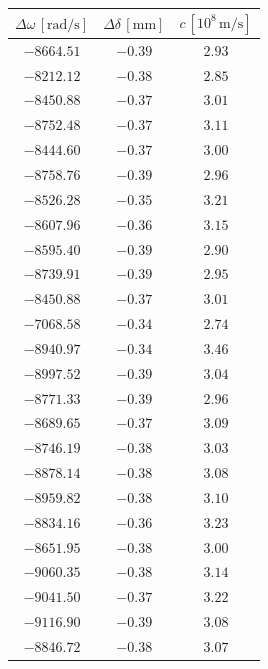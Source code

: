 \documentclass[]{article}
\begin{document}
    \begin{table}
        \centering
        \begin{tabular}{||c|c|c||}
            \hline
            $\Delta \omega \,[\text{rad/s}]$ & $\Delta \delta \,[\text{mm}]$ & $c \,[10^8 \,\text{m/s}]$ \\
            \hline\hline
            $-8664.51$ & $-0.39$ & $2.93$ \\\hline
            $-8212.12$ & $-0.38$ & $2.85$ \\\hline
            $-8450.88$ & $-0.37$ & $3.01$ \\\hline
            $-8752.48$ & $-0.37$ & $3.11$ \\\hline
            $-8444.60$ & $-0.37$ & $3.00$ \\\hline
            $-8758.76$ & $-0.39$ & $2.96$ \\\hline
            $-8526.28$ & $-0.35$ & $3.21$ \\\hline
            $-8607.96$ & $-0.36$ & $3.15$ \\\hline
            $-8595.40$ & $-0.39$ & $2.90$ \\\hline
            $-8739.91$ & $-0.39$ & $2.95$ \\\hline
            $-8450.88$ & $-0.37$ & $3.01$ \\\hline
            $-7068.58$ & $-0.34$ & $2.74$ \\\hline
            $-8940.97$ & $-0.34$ & $3.46$ \\\hline
            $-8997.52$ & $-0.39$ & $3.04$ \\\hline
            $-8771.33$ & $-0.39$ & $2.96$ \\\hline
            $-8689.65$ & $-0.37$ & $3.09$ \\\hline
            $-8746.19$ & $-0.38$ & $3.03$ \\\hline
            $-8878.14$ & $-0.38$ & $3.08$ \\\hline
            $-8959.82$ & $-0.38$ & $3.10$ \\\hline
            $-8834.16$ & $-0.36$ & $3.23$ \\\hline
            $-8651.95$ & $-0.38$ & $3.00$ \\\hline
            $-9060.35$ & $-0.38$ & $3.14$ \\\hline
            $-9041.50$ & $-0.37$ & $3.22$ \\\hline
            $-9116.90$ & $-0.39$ & $3.08$ \\\hline
            $-8846.72$ & $-0.38$ & $3.07$ \\\hline

\end{tabular}
\end{table}
\end{document}
